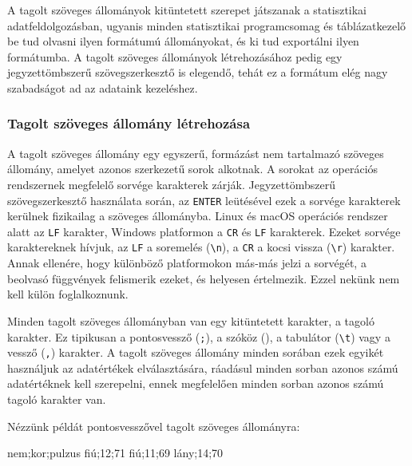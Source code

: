 \documentclass[
]{book}
\newenvironment{Shaded}{\begin{snugshade}}{\end{snugshade}}
\newcommand{\NormalTok}[1]{#1}
\begin{document}
A tagolt szöveges állományok kitüntetett szerepet játszanak a statisztikai adatfeldolgozásban, ugyanis minden statisztikai programcsomag és táblázatkezelő be tud olvasni ilyen formátumú állományokat, és ki tud exportálni ilyen formátumba. A tagolt szöveges állományok létrehozásához pedig egy jegyzettömbszerű szövegszerkesztő is elegendő, tehát ez a formátum elég nagy szabadságot ad az adataink kezeléshez.

\hypertarget{tagolt-szuxf6veges-uxe1llomuxe1ny-luxe9trehozuxe1sa}{%
\subsubsection{Tagolt szöveges állomány létrehozása}\label{tagolt-szuxf6veges-uxe1llomuxe1ny-luxe9trehozuxe1sa}}

A tagolt szöveges állomány egy egyszerű, formázást nem tartalmazó szöveges állomány, amelyet azonos szerkezetű sorok alkotnak. A sorokat az operációs rendszernek megfelelő sorvége karakterek zárják. Jegyzettömbszerű szövegszerkesztő használata során, az \texttt{ENTER} leütésével ezek a sorvége karakterek kerülnek fizikailag a szöveges állományba. Linux és macOS operációs rendszer alatt az \texttt{LF} karakter, Windows platformon a \texttt{CR} és \texttt{LF} karakterek. Ezeket sorvége karaktereknek hívjuk, az \texttt{LF} a soremelés (\texttt{\textbackslash{}n}), a \texttt{CR} a kocsi vissza (\texttt{\textbackslash{}r}) karakter. Annak ellenére, hogy különböző platformokon más-más jelzi a sorvégét, a beolvasó függvények felismerik ezeket, és helyesen értelmezik. Ezzel nekünk nem kell külön foglalkoznunk.

Minden tagolt szöveges állományban van egy kitüntetett karakter, a tagoló karakter. Ez tipikusan a pontosvessző (\texttt{;}), a szóköz (\texttt{}), a tabulátor (\texttt{\textbackslash{}t}) vagy a vessző (\texttt{,}) karakter. A tagolt szöveges állomány minden sorában ezek egyikét használjuk az adatértékek elválasztására, ráadásul minden sorban azonos számú adatértéknek kell szerepelni, ennek megfelelően minden sorban azonos számú tagoló karakter van.

Nézzünk példát pontosvesszővel tagolt szöveges állományra:

\begin{Shaded}
\begin{Highlighting}[]
\NormalTok{nem;kor;pulzus}
\NormalTok{fiú;12;71}
\NormalTok{fiú;11;69}
\NormalTok{lány;14;70}
\end{Highlighting}
\end{Shaded}
\end{document}

